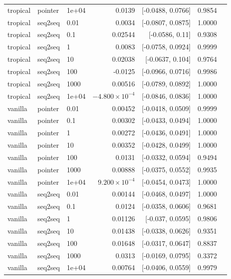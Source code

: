 \documentclass[10pt]{article}
\begin{document}
{\begin{longtable}{lllrrrl}
tropical & pointer & 1e+04 & 0.0139 & [-0.0488, 0.0766] & 0.9854 & \\
tropical & seq2seq & 0.01 & 0.0034 & [-0.0807, 0.0875] & 1.0000 & \\
tropical & seq2seq & 0.1 & 0.02544 & [-0.0586, 0.11] & 0.9308 & \\
tropical & seq2seq & 1 & 0.0083 & [-0.0758, 0.0924] & 0.9999 & \\
tropical & seq2seq & 10 & 0.02038 & [-0.0637, 0.104] & 0.9764 & \\
tropical & seq2seq & 100 & -0.0125 & [-0.0966, 0.0716] & 0.9986 & \\
tropical & seq2seq & 1000 & 0.00516 & [-0.0789, 0.0892] & 1.0000 & \\
tropical & seq2seq & 1e+04 & $-4.800\times10^{-4}$ & [-0.0846, 0.0836] & 1.0000 & \\
vanilla & pointer & 0.01 & 0.00452 & [-0.0418, 0.0509] & 0.9999 & \\
vanilla & pointer & 0.1 & 0.00302 & [-0.0433, 0.0494] & 1.0000 & \\
vanilla & pointer & 1 & 0.00272 & [-0.0436, 0.0491] & 1.0000 & \\
vanilla & pointer & 10 & 0.00352 & [-0.0428, 0.0499] & 1.0000 & \\
vanilla & pointer & 100 & 0.0131 & [-0.0332, 0.0594] & 0.9494 & \\
vanilla & pointer & 1000 & 0.00888 & [-0.0375, 0.0552] & 0.9935 & \\
vanilla & pointer & 1e+04 & $9.200\times10^{-4}$ & [-0.0454, 0.0473] & 1.0000 & \\
vanilla & seq2seq & 0.01 & 0.00144 & [-0.0468, 0.0497] & 1.0000 & \\
vanilla & seq2seq & 0.1 & 0.0124 & [-0.0358, 0.0606] & 0.9681 & \\
vanilla & seq2seq & 1 & 0.01126 & [-0.037, 0.0595] & 0.9806 & \\
vanilla & seq2seq & 10 & 0.01438 & [-0.0338, 0.0626] & 0.9351 & \\
vanilla & seq2seq & 100 & 0.01648 & [-0.0317, 0.0647] & 0.8837 & \\
vanilla & seq2seq & 1000 & 0.0313 & [-0.0169, 0.0795] & 0.3372 & \\
vanilla & seq2seq & 1e+04 & 0.00764 & [-0.0406, 0.0559] & 0.9979 & \\
\bottomrule
\end{longtable}
}
\end{document}
